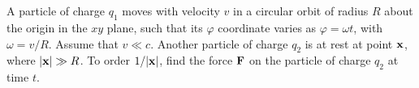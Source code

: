 \documentclass[11pt]{article}
\newenvironment{statement}[1]
{
	\section{#1}
	\color{darkgray}
	\ignorespaces
}
{
}
\begin{document}
\newcommand{\vaa}{\vb{a}}
\newcommand{\vp}{\vb{p}}
\newcommand{\vv}{\vb{v}}
\newcommand{\vx}{\vb{x}}
\newcommand{\vB}{\vb{B}}
\newcommand{\vE}{\vb{E}}
\newcommand{\vF}{\vb{F}}
\newcommand{\vJ}{\vb{J}}
\newcommand{\vomg}{\boldsymbol{\omega}}

\newcommand{\del}{\delta}
\newcommand{\vph}{\varphi}
\newcommand{\tht}{\theta}
\newcommand{\omg}{\omega}

\newcommand{\rhox}{\rho(x)}
\newcommand{\dcx}{\dd[3]{x}}

\newcommand{\cV}{\mathcal{V}}
\newcommand{\intcV}{\int_\cV}
\newcommand{\intS}{\int_S}
\newcommand{\dS}{\dd{S}}

\renewcommand{\xi}{x_i}
\newcommand{\limRi}{\lim_{R \to \infty}}

\newcommand{\nh}{\vb{\hat{n}}}
\newcommand{\rh}{\vb{\hat{r}}}
\newcommand{\xh}{\vb{\hat{x}}}
\newcommand{\zh}{\vb{\hat{z}}}
\newcommand{\phh}{\boldsymbol{\hat{\vph}}}





\renewcommand{\qq}{q_1}
\newcommand{\qw}{q_2}
\newcommand{\absx}{\abs{\vx}}
\newcommand{\tx}{(t, \vx)}

\newcommand{\rhoq}{\rho_1}
\newcommand{\vEq}{\vE_1}
\newcommand{\vpq}{\vp_1}
\newcommand{\vpqt}{\vpq(t)}
\newcommand{\vxq}{\vx_1}
\newcommand{\vxqt}{\vxq(t)}

\newcommand{\ret}{\text{ret}}

\begin{statement}{}
	A particle of charge $\qq$ moves with velocity $v$ in a circular orbit of radius $R$ about the origin in the $xy$ plane, such that its $\vph$ coordinate varies as $\vph = \omg t$, with $\omg = v / R$.  Assume that $v \ll c$.  Another particle of charge $\qw$ is at rest at point $\vx$, where $\absx \gg R$.  To order $1 / \absx$, find the force $\vF$ on the particle of charge $\qw$ at time $t$.
\end{statement}
\end{document}
